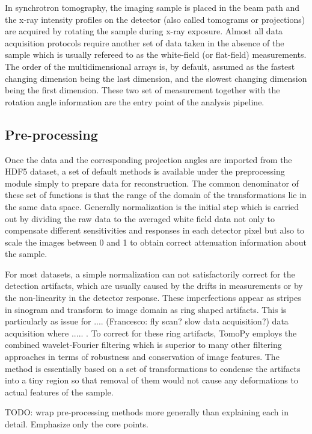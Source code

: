 \documentclass[pdf]{iucr}              %
\begin{document}
In synchrotron tomography, the imaging sample is placed in the beam path and the x-ray intensity profiles on the detector (also called tomograms or projections) are acquired by rotating the sample during x-ray exposure. Almost all data acquisition protocols require another set of data taken in the absence of the sample which is usually refereed to as the white-field (or flat-field) measurements. The order of the multidimensional arrays is, by default, assumed as the fastest changing dimension being the last dimension, and the slowest changing dimension being the first dimension. These two set of measurement together with the rotation angle information are the entry point of the analysis pipeline.

\subsection{Pre-processing} 

Once the data and the corresponding projection angles are imported from the HDF5 dataset, a set of default methods is available under the preprocessing module simply to prepare data for reconstruction. The common denominator of these set of functions is that the range of the domain of the transformations lie in the same data space. Generally normalization is the initial step which is carried out by dividing the raw data to the averaged white field data not only to compensate different sensitivities and responses in each detector pixel but also to scale the images between 0 and 1 to obtain correct attenuation information about the sample. 

For most datasets, a simple normalization can not satisfactorily correct for the detection artifacts, which are usually caused by the drifts in measurements or by the non-linearity in the detector response. These imperfections appear as stripes in sinogram and transform to image domain as ring shaped artifacts. This is particularly as issue for .... (Francesco: fly scan? slow data acquisition?) data acquisition where ..... . To correct for these ring artifacts, TomoPy employs the combined wavelet-Fourier filtering \cite{Munch:09} which is superior to many other filtering approaches in terms of robustness and conservation of image features. The method is essentially based on a set of transformations to condense the artifacts into a tiny region so that removal of them would not cause any deformations to actual features of the sample. 

TODO: wrap pre-processing methods more generally than explaining each in detail. Emphasize only the core points.
\end{document}
